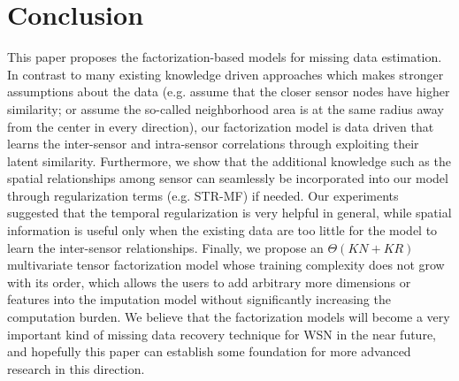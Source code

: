 \section{Conclusion}  \label{sec:conc}
This paper proposes the factorization-based models for missing data estimation. In contrast to many existing knowledge driven approaches which makes stronger assumptions about the data (e.g. assume that the closer sensor nodes have higher similarity; or assume the so-called neighborhood area is at the same radius away from the center in every direction), our factorization model is data driven that learns the inter-sensor and intra-sensor correlations through exploiting their latent similarity. Furthermore, we show that the additional knowledge such as the spatial relationships among sensor can seamlessly be incorporated into our model through regularization terms (e.g. STR-MF) if needed. Our experiments suggested that the temporal regularization is very helpful in general, while spatial information is useful only when the existing data are too little for the model to learn the inter-sensor relationships. Finally, we propose an $\Theta(KN + KR)$ multivariate tensor factorization model whose training complexity does not grow with its order, which allows the users to add arbitrary more dimensions or features into the imputation model without significantly increasing the computation burden.
We believe that the factorization models will become a very important kind of missing data recovery technique for WSN in the near future, and hopefully this paper can establish some foundation for more advanced research in this direction. 
